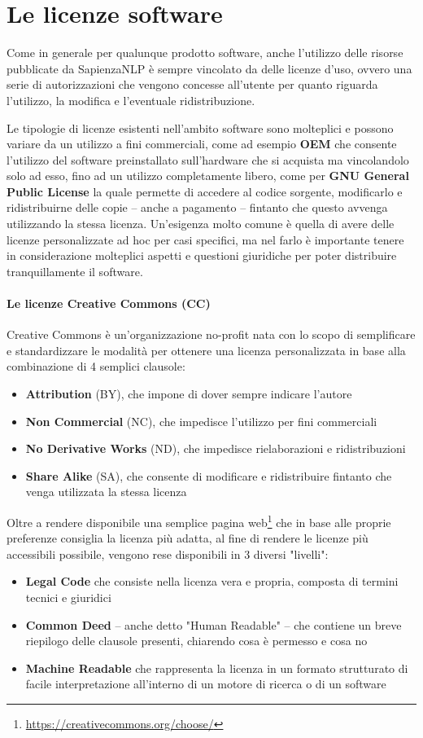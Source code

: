 \section{Le licenze software}
Come in generale per qualunque prodotto software, anche l'utilizzo delle risorse
pubblicate da SapienzaNLP è sempre vincolato da delle licenze d'uso, ovvero una
serie di autorizzazioni che vengono concesse all'utente per quanto riguarda l'utilizzo,
la modifica e l'eventuale ridistribuzione.

Le tipologie di licenze esistenti nell'ambito software sono molteplici e possono
variare da un utilizzo a fini commerciali, come ad esempio \textbf{OEM}
che consente l'utilizzo del software preinstallato sull'hardware che si acquista
ma vincolandolo solo ad esso, fino ad un utilizzo completamente libero, come per
\textbf{GNU General Public License} la quale permette di accedere al codice sorgente,
modificarlo e ridistribuirne delle copie -- anche a pagamento -- fintanto che questo
avvenga utilizzando la stessa licenza.
Un'esigenza molto comune è quella di avere delle licenze personalizzate ad hoc
per casi specifici, ma nel farlo è importante tenere in considerazione molteplici
aspetti e questioni giuridiche per poter distribuire tranquillamente il software. 

\paragraph{Le licenze Creative Commons (CC) \cite{cc:licenses}}
Creative Commons è un'organizzazione no-profit nata con lo scopo di semplificare
e standardizzare le modalità per ottenere una licenza personalizzata in base alla
combinazione di 4 semplici clausole:
\begin{itemize}
	\item \textbf{Attribution} (BY), che impone di dover sempre indicare l'autore	
	\item \textbf{Non Commercial} (NC), che impedisce l'utilizzo per fini commerciali
	\item \textbf{No Derivative Works} (ND), che impedisce rielaborazioni e ridistribuzioni
	\item \textbf{Share Alike} (SA), che consente di modificare e ridistribuire
	fintanto che venga utilizzata la stessa licenza
\end{itemize}
Oltre a rendere disponibile una semplice pagina web\footnote{\url{https://creativecommons.org/choose/}}
che in base alle proprie preferenze consiglia la licenza più adatta, al fine di rendere
le licenze più accessibili possibile, vengono rese disponibili in 3 diversi "livelli":
\begin{itemize}
	\item \textbf{Legal Code} che consiste nella licenza vera e propria, composta
	di termini tecnici e giuridici
	\item \textbf{Common Deed} -- anche detto "Human Readable" -- che contiene
	un breve riepilogo delle clausole presenti, chiarendo cosa è permesso e cosa no
	\item \textbf{Machine Readable} che rappresenta la licenza in un formato strutturato
	di facile interpretazione all'interno di un motore di ricerca o di un software
\end{itemize}

